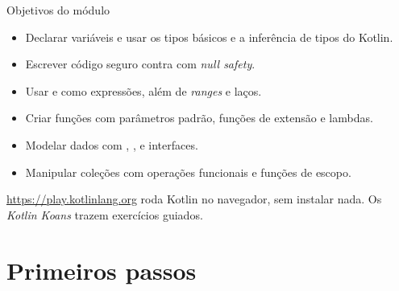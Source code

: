 \documentclass[aspectratio=169,10pt]{beamer}
\begin{document}
\capa

\begin{frame}{Objetivos do módulo}
  \begin{conceito}
    \begin{itemize}
      \item Declarar variáveis e usar os tipos básicos e a inferência de tipos do Kotlin.
      \item Escrever código seguro contra  com \emph{null safety}.
      \item Usar  e  como expressões, além de \emph{ranges} e laços.
      \item Criar funções com parâmetros padrão, funções de extensão e lambdas.
      \item Modelar dados com , ,  e interfaces.
      \item Manipular coleções com operações funcionais e funções de escopo.
    \end{itemize}
  \end{conceito}
  \begin{dica}
    \url{https://play.kotlinlang.org} roda Kotlin no navegador, sem instalar nada. Os \emph{Kotlin Koans} trazem exercícios guiados.
  \end{dica}
\end{frame}

\sumario



\section{Primeiros passos}
\end{document}
